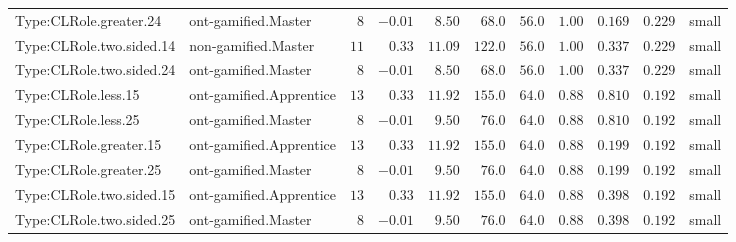 \documentclass[6pt,a4paper]{article}
\begin{document}
{\begin{longtable}{llrrrrrrrrl}
Type:CLRole.greater.24&ont-gamified.Master&$ 8$&$-0.01$&$ 8.50$&$ 68.0$&$ 56.0$&$ 1.00$&$0.169$&$0.229$&small\tabularnewline
Type:CLRole.two.sided.14&non-gamified.Master&$11$&$ 0.33$&$11.09$&$122.0$&$ 56.0$&$ 1.00$&$0.337$&$0.229$&small\tabularnewline
Type:CLRole.two.sided.24&ont-gamified.Master&$ 8$&$-0.01$&$ 8.50$&$ 68.0$&$ 56.0$&$ 1.00$&$0.337$&$0.229$&small\tabularnewline
Type:CLRole.less.15&ont-gamified.Apprentice&$13$&$ 0.33$&$11.92$&$155.0$&$ 64.0$&$ 0.88$&$0.810$&$0.192$&small\tabularnewline
Type:CLRole.less.25&ont-gamified.Master&$ 8$&$-0.01$&$ 9.50$&$ 76.0$&$ 64.0$&$ 0.88$&$0.810$&$0.192$&small\tabularnewline
Type:CLRole.greater.15&ont-gamified.Apprentice&$13$&$ 0.33$&$11.92$&$155.0$&$ 64.0$&$ 0.88$&$0.199$&$0.192$&small\tabularnewline
Type:CLRole.greater.25&ont-gamified.Master&$ 8$&$-0.01$&$ 9.50$&$ 76.0$&$ 64.0$&$ 0.88$&$0.199$&$0.192$&small\tabularnewline
\newpage
Type:CLRole.two.sided.15&ont-gamified.Apprentice&$13$&$ 0.33$&$11.92$&$155.0$&$ 64.0$&$ 0.88$&$0.398$&$0.192$&small\tabularnewline
Type:CLRole.two.sided.25&ont-gamified.Master&$ 8$&$-0.01$&$ 9.50$&$ 76.0$&$ 64.0$&$ 0.88$&$0.398$&$0.192$&small\tabularnewline
\hline
\end{longtable}}
\end{document}

